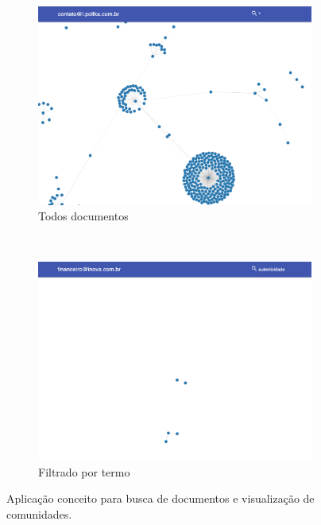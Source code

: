 \documentclass[12pt,a4paper]{article}
\begin{document}
\begin{figure}[H]
  \centering
  \begin{subfigure}[b]{0.48\textwidth}
      \includegraphics[width=\textwidth]{images/figure_9.png}
      \caption{Todos documentos}
      \label{fig-search-all}
  \end{subfigure}
  ~ %
  \begin{subfigure}[b]{0.48\textwidth}
      \includegraphics[width=\textwidth]{images/figure_10.png}
      \caption{Filtrado por termo}
      \label{fig-search-filtered}
  \end{subfigure}
  \caption{Aplicação conceito para busca de documentos e visualização de comunidades.}
  \label{fig-search-explorer}
\end{figure}
\end{document}
